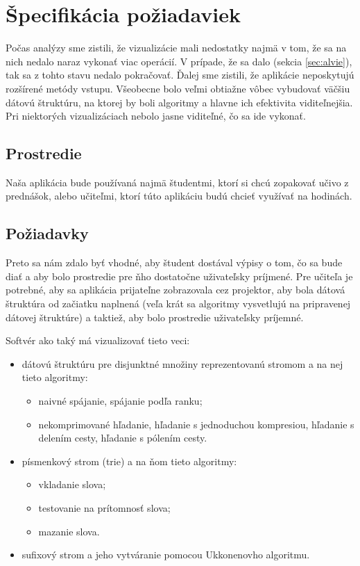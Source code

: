 \section{Špecifikácia požiadaviek}

Počas analýzy sme zistili, že vizualizácie mali nedostatky najmä v tom, že sa 
na nich nedalo naraz vykonať viac operácií. V prípade, že sa dalo (sekcia 
\ref{sec:alvie}), tak sa z tohto stavu nedalo pokračovať. Ďalej sme zistili, 
že aplikácie neposkytujú rozšírené metódy vstupu. Všeobecne bolo veľmi 
obtiažne vôbec vybudovať väčšiu dátovú štruktúru, na ktorej by boli algoritmy 
a hlavne ich efektivita viditeľnejšia. Pri niektorých vizualizáciach nebolo 
jasne viditeľné, čo sa ide vykonať.

\subsection{Prostredie}

Naša aplikácia bude používaná najmä študentmi, ktorí si chcú zopakovať učivo 
z prednášok, alebo učiteľmi, ktorí túto aplikáciu budú chcieť využívať na 
hodinách.

\subsection{Požiadavky}

Preto sa nám zdalo byť vhodné, aby študent dostával výpisy o tom, čo sa bude 
diať a aby bolo prostredie pre ňho dostatočne uživateľsky príjmené. Pre 
učiteľa je potrebné, aby sa aplikácia prijateľne zobrazovala cez projektor, 
aby bola dátová štruktúra od začiatku naplnená (veľa krát sa algoritmy 
vysvetlujú na pripravenej dátovej štruktúre) a taktiež, aby bolo prostredie 
uživateľsky príjemné.

Softvér ako taký má vizualizovať tieto veci:
\begin{itemize}
\item dátovú štruktúru pre disjunktné množiny reprezentovanú stromom a na nej 
tieto algoritmy:
	\begin{itemize}
	\item naivné spájanie, spájanie podľa ranku;
	\item nekomprimované hľadanie, hľadanie s jednoduchou kompresiou, hľadanie s 
	delením cesty, hľadanie s pólením cesty.
	\end{itemize}
\item písmenkový strom (trie) a na ňom tieto algoritmy:
	\begin{itemize}
	\item vkladanie slova;
	\item testovanie na prítomnosť slova;
	\item mazanie slova.
	\end{itemize}
\item sufixový strom a jeho vytváranie pomocou Ukkonenovho algoritmu.
\end{itemize}

